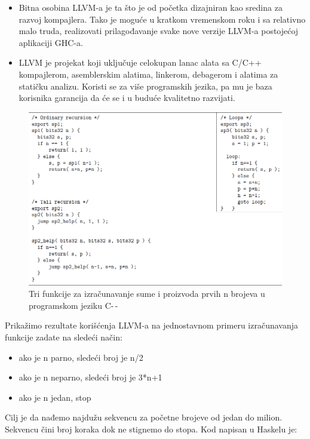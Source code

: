 \begin{enumerate}
\begin{itemize}
		\item Bitna osobina LLVM-a je ta što je od početka dizajniran kao sredina za razvoj kompajlera. Tako je moguće u kratkom vremenskom roku i sa relativno malo truda, realizovati prilagođavanje svake nove verzije LLVM-a postojećoj aplikaciji GHC-a. 
		\item LLVM je projekat koji uključuje celokupan lanac alata sa C/C++ kompajlerom, asemblerskim alatima, linkerom, debagerom i alatima za statičku analizu. Koristi se za više programskih jezika, pa mu je baza korisnika garancija da će se i u buduće kvalitetno razvijati. 
	\end{itemize}
\end{enumerate}


\begin{figure}[h!]
	\begin{center}
		\includegraphics[scale=0.40]{resources/cmm.png}
	\end{center}
	\caption{Tri funkcije za izračunavanje sume i proizvoda prvih n brojeva u programskom jeziku C-\,-}
	\label{fig:cmm}
\end{figure}

Prikažimo rezultate korišćenja LLVM-a na jednostavnom primeru izračunavanja funkcije zadate na sledeći način:
\begin{itemize}
	\item ako je n parno, sledeći broj je n/2
	\item ako je n neparno, sledeći broj je 3*n+1
	\item ako je n jedan, stop
\end{itemize}

Cilj je da nađemo najdužu sekvencu za početne brojeve od jedan do milion. Sekvencu čini broj koraka dok ne stignemo do stopa. Kod napisan u Haskelu je:

